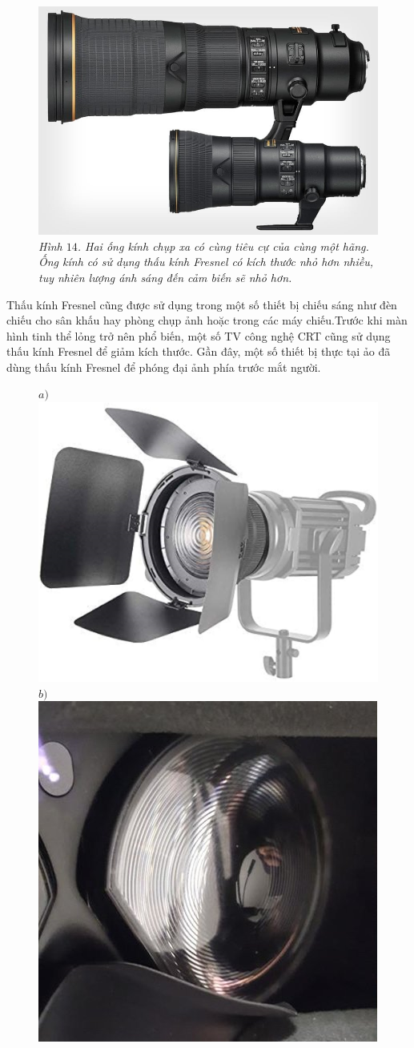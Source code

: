 \begin{multicols}{2}
\begin{figure}[H]
		\includegraphics[width= 1\linewidth]{15}
		\caption{\small\textit{\color{timhieukhoahoc}Hình $14$. Hai ống kính chụp xa có cùng tiêu cự của cùng một hãng. Ống kính có sử dụng thấu kính Fresnel có kích thước nhỏ hơn nhiều, tuy nhiên lượng ánh sáng đến cảm biến sẽ nhỏ hơn.}}
		\vspace*{-10pt}
	\end{figure}
	Thấu kính Fresnel cũng được sử dụng trong một số thiết bị chiếu sáng như đèn chiếu cho sân khấu hay phòng chụp ảnh hoặc trong các máy chiếu.Trước khi màn hình tinh thể lỏng trở nên phổ biến, một số TV công nghệ CRT cũng sử dụng thấu kính Fresnel để giảm kích thước. Gần đây, một số thiết bị thực tại ảo đã dùng thấu kính Fresnel để phóng đại ảnh phía trước mắt người.
	\begin{figure}[H]
		\vspace*{-5pt}
		\centering
		\captionsetup{labelformat= empty, justification=centering}
		$a)$\includegraphics[width= 0.4\linewidth]{16a}
		$b)$\includegraphics[width= 0.4\linewidth]{16b}

\end{figure}
\end{multicols}
